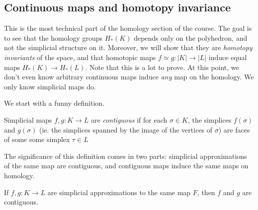 \documentclass[a4paper]{article}
\begin{document}
\subsection{Continuous maps and homotopy invariance}
This is the most technical part of the homology section of the course. The goal is to see that the homology groups $H_*(K)$ depends only on the polyhedron, and not the simplicial structure on it. Moreover, we will show that they are \emph{homotopy invariants} of the space, and that homotopic maps $f \simeq g: |K| \to |L|$ induce equal maps $H_*(K) \to H_*(L)$. Note that this is a lot to prove. At this point, we don't even know arbitrary continuous maps induce \emph{any} map on the homology. We only know simplicial maps do.

We start with a funny definition.
\begin{defi}
  Simplicial maps $f, g: K \to L$ are \emph{contiguous} if for each $\sigma \in K$, the simplices $f(\sigma)$ and $g(\sigma)$ (ie. the simplices spanned by the image of the vertices of $\sigma$) are faces of some some simplex $\tau \in L$
  \begin{center}
  \end{center}
\end{defi}

The significance of this definition comes in two parts: simplicial approximations of the same map are contiguous, and contiguous maps induce the same maps on homology.

\begin{lemma}
  If $f, g: K \to L$ are simplicial approximations to the same map $F$, then $f$ and $g$ are contiguous.
\end{lemma}
\end{document}
